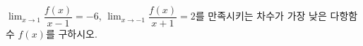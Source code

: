 $\displaystyle\lim_{x\to 1}\dfrac{f(x)}{x-1}=-6$, $\displaystyle\lim_{x\to -1}\dfrac{f(x)}{x+1}=2$를 만족시키는 차수가 가장 낮은 다항함수 $f(x)$를 구하시오.
